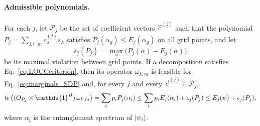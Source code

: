 \documentclass[aps,pra,twocolumn,showpacs,superscriptaddress,groupedaddress]{revtex4-2}
\newcommand{\one}[0]{\mathds{1}}
\renewcommand{\a}{\alpha}
\newcommand{\I}{\one}
\begin{document}
\begin{widetext}
\paragraph*{Admissible polynomials.}
For each $j$, let $\mathcal{P}_j$ be the set of coefficient vectors $\vec c^{(j)}$ such that the polynomial $P_j=\sum_{\lambda\vdash m}c^{(j)}_\lambda s_\lambda$ satisfies $P_j(\a_g)\leq E_j(\a_g)$ on all grid points, and let
\begin{equation}
    \epsilon_j(P_j)=\max_{\a}\big(P_j(\a)-E_j(\a)\big)
\end{equation}
be its maximal violation between grid points. If a decomposition satisfies Eq.~\eqref{eq:LOCCcriterion}, then its operator $\omega_{k,m}$ is feasible for Eq.~\eqref{eq:marginals_SDP} and, for every $j$ and every $\vec c^{(j)}\in\mathcal{P}_j$,
\begin{equation}\label{eq:LOCCnecessary}
    \tr\big((O_{P_j}\otimes\I^B)\,\omega_{k,m}\big)=\sum_ip_iP_j(\a_i)\leq\sum_ip_iE_j(\a_i)+\epsilon_j(P_j)\leq E_j(\psi)+\epsilon_j(P_j),
\end{equation}
where $\a_i$ is the entanglement spectrum of $\ket{\psi_i}$.


\end{widetext}
\end{document}
